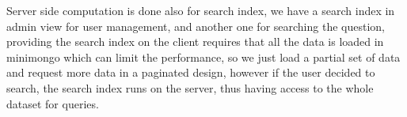 \newParagraph
Server side computation is done also for search index, we have a search index in admin view for user management, and another one
for searching the question, providing the search index on the client requires that all the data is loaded in minimongo which can limit the performance,
so we just load a partial set of data and request more data in a paginated design, however if the user decided to search, the search index runs on the
server, thus having access to the whole dataset for queries.
